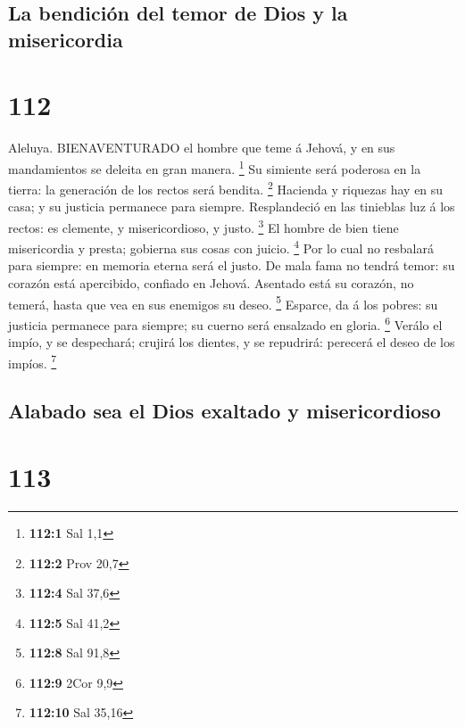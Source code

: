 \hypertarget{la-bendiciuxf3n-del-temor-de-dios-y-la-misericordia}{%
\subsection{La bendición del temor de Dios y la
misericordia}\label{la-bendiciuxf3n-del-temor-de-dios-y-la-misericordia}}

\hypertarget{section-111}{%
\section{112}\label{section-111}}

 Aleluya. BIENAVENTURADO el hombre que teme á Jehová, y en
sus mandamientos se deleita en gran manera. \footnote{\textbf{112:1} Sal
  1,1}  Su simiente será poderosa en la tierra: la
generación de los rectos será bendita. \footnote{\textbf{112:2} Prov
  20,7}  Hacienda y riquezas hay en su casa; y su justicia
permanece para siempre.  Resplandeció en las tinieblas luz á
los rectos: es clemente, y misericordioso, y justo. \footnote{\textbf{112:4}
  Sal 37,6}  El hombre de bien tiene misericordia y presta;
gobierna sus cosas con juicio. \footnote{\textbf{112:5} Sal 41,2}
 Por lo cual no resbalará para siempre: en memoria eterna
será el justo.  De mala fama no tendrá temor: su corazón
está apercibido, confiado en Jehová.  Asentado está su
corazón, no temerá, hasta que vea en sus enemigos su deseo. \footnote{\textbf{112:8}
  Sal 91,8}  Esparce, da á los pobres: su justicia permanece
para siempre; su cuerno será ensalzado en gloria. \footnote{\textbf{112:9}
  2Cor 9,9}  Verálo el impío, y se despechará; crujirá los
dientes, y se repudrirá: perecerá el deseo de los impíos. \footnote{\textbf{112:10}
  Sal 35,16}

\hypertarget{alabado-sea-el-dios-exaltado-y-misericordioso}{%
\subsection{Alabado sea el Dios exaltado y
misericordioso}\label{alabado-sea-el-dios-exaltado-y-misericordioso}}

\hypertarget{section-112}{%
\section{113}\label{section-112}}


